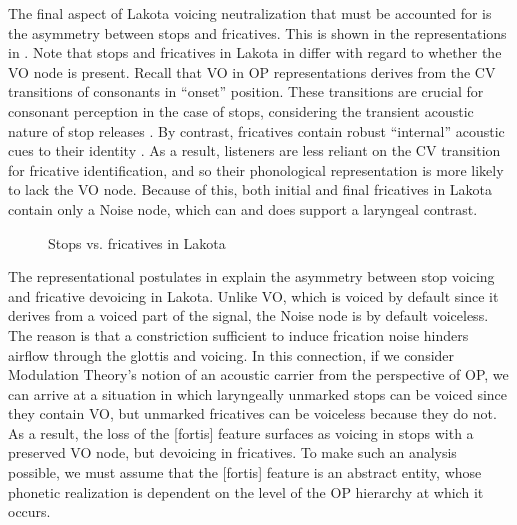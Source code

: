 \documentclass[output=paper]{langscibook}
\begin{document}
The final aspect of Lakota voicing neutralization that must be accounted for is the asymmetry between stops and fricatives. This is shown in the representations in . Note that stops and fricatives in Lakota in  differ with regard to whether the VO node is present. Recall that VO in OP representations derives from the CV transitions of consonants in “onset” position. These transitions are crucial for consonant perception in the case of stops, considering the transient acoustic nature of stop releases \citep{Wright2004}. By contrast, fricatives contain robust “internal” acoustic cues to their identity \citep{Wright2004}. As a result, listeners are less reliant on the CV transition for fricative identification, and so their phonological representation is more likely to lack the VO node. Because of this, both initial and final fricatives in Lakota contain only a Noise node, which can and does support a laryngeal contrast.


\begin{figure}
\caption{\label{exfig:schwartz:13}Stops vs. fricatives in Lakota}
\end{figure}
 

The representational postulates in  explain the asymmetry between stop voicing and fricative devoicing in Lakota. Unlike VO, which is voiced by default since it derives from a voiced part of the signal, the Noise node is by default voiceless. The reason is that a constriction sufficient to induce frication noise hinders airflow through the glottis and voicing. In this connection, if we consider Modulation Theory’s notion of an acoustic carrier from the perspective of OP, we can arrive at a situation in which laryngeally unmarked stops can be voiced since they contain VO, but unmarked fricatives can be voiceless because they do not. As a result, the loss of the [fortis] feature surfaces as voicing in stops with a preserved VO node, but devoicing in fricatives. To make such an analysis possible, we must assume that the [fortis] feature is an abstract entity, whose phonetic realization is dependent on the level of the OP hierarchy at which it occurs.
\end{document}
